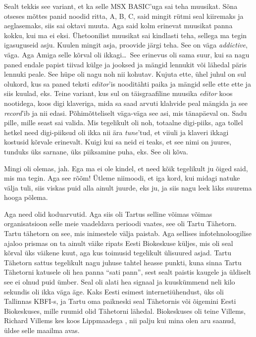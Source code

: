 Sealt tekkis see variant, et ka selle MSX BASIC'uga sai teha muusikat. Sõna otseses mõttes panid noodid ritta, A, B, C, said 
mingit rütmi seal kiiremaks ja aeglasemaks, siis sai oktavi muuta. Aga said 
kolm erinevat muusikat panna kokku, kui ma ei eksi. Ühetoonilist muusikat sai 
kindlasti teha, sellega ma tegin igasuguseid asju. Kuulen mingit asja, proovide 
järgi teha. See on väga \emph{addictive},  väga. Aga Amiga selle kõrval oli 
ikkagi\ldots\ See erinevus oli sama suur, kui sa nagu paned endale  papist 
tiivad külge ja jooksed ja mängid lennukit või lähedal päris lennuki peale. See 
hüpe oli nagu noh nii kohutav. Kujuta ette, ühel juhul on sul olukord, kus sa 
paned teksti \emph{editor}'is  nooditähti paika ja mängid selle ette ette ja 
siis kuulad, eks. Teine variant, kus sul on  täisgraafiline muusika 
\emph{editor} koos nootidega,  koos digi klaveriga, mida sa saad arvuti 
klahvide peal mängida ja see \emph{record}'ib ja nii edasi. Põhimõtteliselt 
väga-väga see asi, mis tänapäeval on. Sadu pille, mille seast sai valida. Mis 
tegelikult oli noh, totaalne digi-piiks, aga tollel hetkel need digi-piiksud 
oli ikka nii ära \emph{tune}'tud, et viiuli ja klaveri ikkagi kostusid kõrvale 
erinevalt. Kuigi kui sa neid ei teaks, et see nimi on juures, tunduks  üks 
sarnane, üks piiksamine puha, eks. See oli kõva.


Mingi oli olemas, jah. Ega ma ei ole kindel, et need kõik tegelikult ju õiged 
said, mis ma tegin. Aga see rõõm! Ütleme niimoodi, et iga kord, kui midagi 
natuke välja tuli, siis viskas puid alla ainult juurde, eks ju, ja siis nagu 
leek läks suurema hooga põlema. 

Aga need olid koduarvutid. Aga siis oli Tartus selline võimas võimas 
organisatsioon selle meie  vaadeldava  perioodi vaates, see oli Tartu 
Tähetorn.
Tartu tähetorn on see, mis inimestele välja paistab. Aga sellises 
infotehnoloogilise ajaloo prismas on ta ainult väike ripats  Eesti  
Biokeskuse 
küljes, mis oli seal kõrval üks väikene kuut, aga kus toimusid tegelikult 
ülisuured asjad. Tartu Tähetorn sattus tegelikult nagu juhuse tahtel  heasse 
punkti, kuna sinna Tartu Tähetorni katusele oli hea panna \enquote{sati pann}, 
sest sealt paistis kaugele ja üldiselt see ei olnud puid ümber. Seal oli alati 
hea signaal ja kuuskümmend neli kilo sekundis oli ikka väga äge. Kaks Eesti 
esimest internetiühendust, üks oli Tallinnas KBFI-s, ja  Tartu oma paikneski 
seal Tähetornis või õigemini Eesti Biokeskuses, mille ruumid olid Tähetorni 
lähedal. Biokeskuses oli teine Villems, Richard Villems kes koos Lippmaadega , nii palju kui mina olen aru saanud, üldse selle  
maailma avas.

